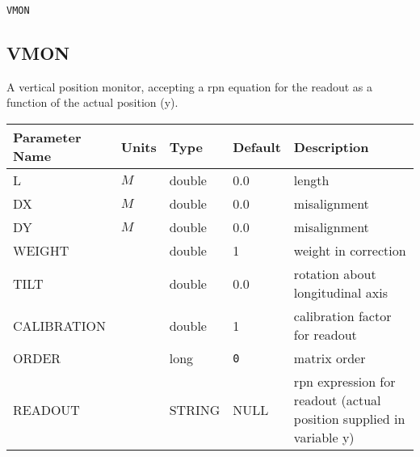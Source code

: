 \begin{latexonly}
\newpage
\begin{center}{\Large\verb|VMON|}\end{center}
\end{latexonly}\subsection{VMON}
A vertical position monitor, accepting a rpn equation for the readout as a
function of the actual position (y).
\\
\begin{tabular}{|l|l|l|l|p{\descwidth}|} \hline
Parameter Name & Units & Type & Default & Description \\ \hline 
L & $M$ & double &  0.0 & length  \\ \hline 
DX & $M$ & double &  0.0 & misalignment  \\ \hline 
DY & $M$ & double &  0.0 & misalignment  \\ \hline 
WEIGHT &  & double &   1 & weight in correction  \\ \hline 
TILT &  & double &  0.0 & rotation about longitudinal axis  \\ \hline 
CALIBRATION &  & double &   1 & calibration factor for readout  \\ \hline 
ORDER &  & long &  \verb|0| & matrix order  \\ \hline 
READOUT &  & STRING &   NULL            & rpn expression for readout (actual position supplied in variable y)  \\ \hline 
\end{tabular}

